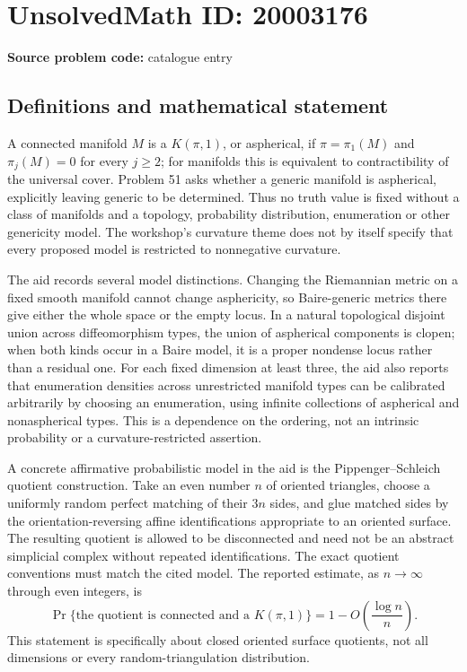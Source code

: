 \documentclass[11pt]{article}
\begin{document}
\section*{UnsolvedMath ID: 20003176}
\textbf{Source problem code:} catalogue entry
\subsection{Definitions and mathematical statement}
A connected manifold $M$ is a $K(\pi,1)$, or aspherical, if $\pi=\pi_1(M)$ and $\pi_j(M)=0$ for every $j\geq2$; for manifolds this is equivalent to contractibility of the universal cover. Problem 51 asks whether a generic manifold is aspherical, explicitly leaving generic to be determined. Thus no truth value is fixed without a class of manifolds and a topology, probability distribution, enumeration or other genericity model. The workshop's curvature theme does not by itself specify that every proposed model is restricted to nonnegative curvature.

The aid records several model distinctions. Changing the Riemannian metric on a fixed smooth manifold cannot change asphericity, so Baire-generic metrics there give either the whole space or the empty locus. In a natural topological disjoint union across diffeomorphism types, the union of aspherical components is clopen; when both kinds occur in a Baire model, it is a proper nondense locus rather than a residual one. For each fixed dimension at least three, the aid also reports that enumeration densities across unrestricted manifold types can be calibrated arbitrarily by choosing an enumeration, using infinite collections of aspherical and nonaspherical types. This is a dependence on the ordering, not an intrinsic probability or a curvature-restricted assertion.

A concrete affirmative probabilistic model in the aid is the Pippenger--Schleich quotient construction. Take an even number $n$ of oriented triangles, choose a uniformly random perfect matching of their $3n$ sides, and glue matched sides by the orientation-reversing affine identifications appropriate to an oriented surface. The resulting quotient is allowed to be disconnected and need not be an abstract simplicial complex without repeated identifications. The exact quotient conventions must match the cited model. The reported estimate, as $n\to\infty$ through even integers, is
\[
 \Pr\{\text{the quotient is connected and a }K(\pi,1)\}
 =1-O\!\left(\frac{\log n}{n}\right).
\]
This statement is specifically about closed oriented surface quotients, not all dimensions or every random-triangulation distribution.
\end{document}
